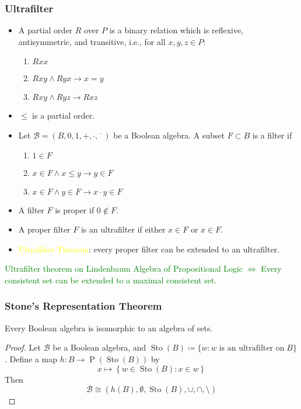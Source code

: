 \documentclass[UTF8,11pt,colorlinks,compress,openany]{beamer}%
\begin{document}
\begin{frame}\frametitle{Ultrafilter}
	\begin{itemize}
		\item A partial order $R$ over $P$ is a binary relation which is reflexive, antisymmetric, and transitive, i.e., for all $x,y,z\in P$:
		\begin{enumerate}
			\item $Rxx$
			\item $Rxy\wedge Ryx\to x=y$
			\item $Rxy\wedge Ryz\to	Rxz$
		\end{enumerate}
		\item $\leq$ is a partial order.
		\item Let $\mathcal{B}=(B,0,1,+,\cdot,\overline{\phantom{x}})$ be a Boolean algebra. A subset $F\subset B$ is a filter if
		\begin{enumerate}
			\item $1\in F$
			\item $x\in F\wedge x\leq y\to y\in F$
			\item $x\in F\wedge y\in F\to x\cdot y\in F$
		\end{enumerate}
		\item A filter $F$ is proper if $0\notin F$.
		\item A proper filter $F$ is an ultrafilter if either $x\in F$ or $\overline{x}\in F$.
		\item \textcolor{yellow}{Ultrafilter Theorem}: every proper filter can be extended to an ultrafilter.
	\end{itemize}
	\centering\textcolor{green}{Ultrafilter theorem on Lindenbaum Algebra of Propositional Logic $\iff$ Every consistent set can be extended to a maximal consistent set.}
\end{frame}

\begin{frame}\frametitle{Stone's Representation Theorem}
	\begin{theorem}
		Every Boolean algebra is isomorphic to an algebra of sets.
	\end{theorem}
	\begin{proof}
		Let $\mathcal{B}$ be a Boolean algebra, and $\operatorname{Sto}(B)\coloneqq \{w: w\;\text{is an ultrafilter on}\;B\}$. Define a map $h: B\to \operatorname{P}\left(\operatorname{Sto}(B)\right)$ by
		\[x\mapsto\left\{w\in\operatorname{Sto}(B): x\in w\right\}\] Then
		\[\mathcal{B}\cong\left(h(B),\emptyset,\operatorname{Sto}(B),\cup,\cap,\setminus\right)\]
	\end{proof}
\end{frame}
\end{document}
